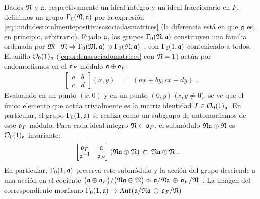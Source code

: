 Dados $\frak{N}$ y $\frak{a}$, respectivamente un ideal \'{\i}ntegro y un
ideal fraccionario en $F$, definimos un grupo $\Gamma_{0}(\frak{N},\frak{a})$
por la expresi\'{o}n \eqref{eq:unidadestotalmentepositivasasociadasmatrices}
(la diferencia est\'{a} en que $\frak{a}$ es, en principio, arbitrario).
Fijado $\frak{a}$, los grupos $\Gamma_{0}(\frak{N},\frak{a})$ constituyen
una familia ordenada por
\begin{math}
	\frak{M}\mid\frak{N}\Rightarrow\Gamma_{0}(\frak{M},\frak{a})
		\supset\Gamma_{0}(\frak{N},\frak{a})
\end{math}~,
con $\Gamma_{0}(1,\frak{a})$ conteniendo a todos. El anillo
$\cal{O}_{0}(1)_{\frak{a}}$ (\eqref{eq:ordenasociadomatrices} con $\frak{N}=1$)
act\'{u}a por endomorfismos en el $\oka{F}$-m\'{o}dulo
$\frak{a}\oplus\oka{F}$:
\begin{align*}
	\begin{bmatrix} a & b \\ c & d \end{bmatrix}(x,y) & \,=\,
			(ax+by,cx+dy)
	\text{ .}
\end{align*}
%
Evaluando en un punto $(x,0)$ y en un punto $(0,y)$ ($x,y\not=0$), se ve que
el \'{u}nico elemento que act\'{u}a trivialmente es la matriz identidad
$I\in\cal{O}_{0}(1)_{\frak{a}}$. En particular, el grupo
$\Gamma_{0}(1,\frak{a})$ se realiza como un subgrupo de automorfismos de
este $\oka{F}$-m\'{o}dulo. Para cada ideal \'{\i}ntegro
$\frak{N}\subset\oka{F}$, el subm\'{o}dulo $\frak{N}\frak{a}\oplus\frak{N}$ es
$\cal{O}_{0}(1)_{\frak{a}}$-invariante:
\begin{align*}
	\begin{bmatrix} \oka{F} & \frak{a} \\
		\frak{a}^{-1} & \oka{F} \end{bmatrix}
			(\frak{N}\frak{a}\oplus\frak{N}) & \,\subset\,
		\frak{N}\frak{a}\oplus\frak{N}
	\text{ .}
\end{align*}
%
En particular, $\Gamma_{0}(1,\frak{a})$ preserva este subm\'{o}dulo y la
acci\'{o}n del grupo desciende a una acci\'{o}n en el cociente
\begin{math}
	\big(\frak{a}\oplus\oka{F}\big)/
		\big(\frak{N}\frak{a}\oplus\frak{N}\big)\simeq
		\frak{a}/\frak{N}\frak{a}\,\oplus\,\oka{F}/\frak{N}
\end{math}~.
La imagen del correspondiente morfismo
\begin{math}
	\Gamma_{0}(1,\frak{a})\rightarrow
		\Auto(\frak{a}/\frak{N}\frak{a}\,\oplus\,\oka{F}/\frak{N})
\end{math}
